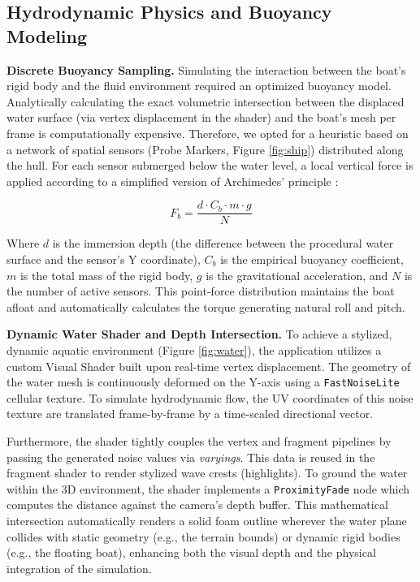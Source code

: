 \subsection{Hydrodynamic Physics and Buoyancy Modeling}

\textbf{Discrete Buoyancy Sampling.} Simulating the interaction between the boat's rigid body and the fluid environment required an optimized buoyancy model. Analytically calculating the exact volumetric intersection between the displaced water surface (via vertex displacement in the shader) and the boat's mesh per frame is computationally expensive. Therefore, we opted for a heuristic based on a network of spatial sensors (Probe Markers, Figure \ref{fig:ship}) distributed along the hull. For each sensor submerged below the water level, a local vertical force is applied according to a simplified version of Archimedes' principle \cite{millington2007game}:

\begin{equation}
    F_{b} = \frac{d \cdot C_{b} \cdot m \cdot g}{N}
\end{equation}

Where $d$ is the immersion depth (the difference between the procedural water surface and the sensor's Y coordinate), $C_{b}$ is the empirical buoyancy coefficient, $m$ is the total mass of the rigid body, $g$ is the gravitational acceleration, and $N$ is the number of active sensors. This point-force distribution maintains the boat afloat and automatically calculates the torque generating natural roll and pitch.

\textbf{Dynamic Water Shader and Depth Intersection.} To achieve a stylized, dynamic aquatic environment (Figure \ref{fig:water}), the application utilizes a custom Visual Shader built upon real-time vertex displacement. The geometry of the water mesh is continuously deformed on the Y-axis using a \texttt{FastNoiseLite} cellular texture. To simulate hydrodynamic flow, the UV coordinates of this noise texture are translated frame-by-frame by a time-scaled directional vector.

Furthermore, the shader tightly couples the vertex and fragment pipelines by passing the generated noise values via \textit{varyings}. This data is reused in the fragment shader to render stylized wave crests (highlights). To ground the water within the 3D environment, the shader implements a \texttt{ProximityFade} node which computes the distance against the camera's depth buffer. This mathematical intersection automatically renders a solid foam outline wherever the water plane collides with static geometry (e.g., the terrain bounds) or dynamic rigid bodies (e.g., the floating boat), enhancing both the visual depth and the physical integration of the simulation.

